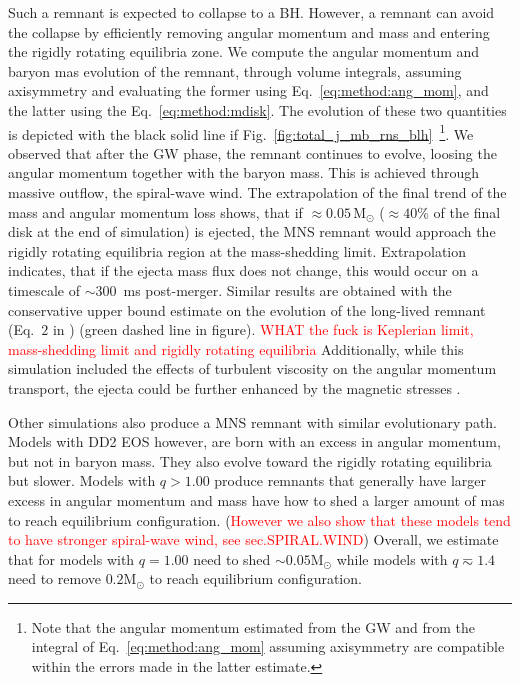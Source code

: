 \documentclass[11pt,a4paper,headinclude=true,DIV=14,BCOR=8mm,chapterprefix,listof=totoc,twoside,openright,abstracton]{scrbook}
\def\Msun{{\text{M}_{\odot}}}
\newcommand{\red}[1]{\textcolor{red}{#1}}
\newcommand{\swind}{spiral-wave wind}
\newcommand{\pmerg}{post-merger}
\begin{document}
Such a remnant is expected to collapse to a BH. 
However, a remnant can avoid the collapse by efficiently removing angular momentum
and mass and entering the rigidly rotating equilibria zone. 
We compute the angular momentum and baryon mas evolution of the remnant, 
through volume integrals, assuming axisymmetry and evaluating the former using Eq.~\eqref{eq:method:ang_mom}, and the latter using the Eq.~\eqref{eq:method:mdisk}. 
The evolution of these two quantities is depicted with the black solid line if 
Fig.~\eqref{fig:total_j_mb_rns_blh}~\footnote{Note that the angular momentum estimated
    from the GW and from the integral of Eq.~\eqref{eq:method:ang_mom} assuming
    axisymmetry are compatible within the errors made in the latter estimate.
}.
We observed that after the \ac{GW} phase, the remnant continues to evolve, loosing the 
angular momentum together with the baryon mass. This is achieved through massive outflow,
the \swind{}. 
The extrapolation of the final trend of the mass and angular momentum loss shows, that 
if $\approx0.05\,\Msun$ ($\approx40$\% of the final disk at the end of simulation) is 
ejected, the \ac{MNS} remnant would approach the rigidly rotating equilibria region 
at the mass-shedding limit. Extrapolation indicates, that if the ejecta mass flux does 
not change, this would occur on a timescale of $\sim 300$~ms \pmerg{}.
Similar results are obtained with the conservative upper bound estimate on the 
evolution of the long-lived remnant (Eq.~$2$ in \citet{Radice:2018xqa}) (green dashed line in figure).
\red{WHAT the fuck is Keplerian limit, mass-shedding limit and rigidly rotating equilibria}
Additionally, while this simulation included the effects of turbulent viscosity on the
angular momentum transport, the ejecta could be further enhanced by the magnetic stresses 
\citep{Metzger:2006mw,Bucciantini:2011kx,Siegel:2017nub,Fernandez:2018kax,Ciolfi:2020hgg}.

Other simulations also produce a \ac{MNS} remnant with similar evolutionary path. 
Models with DD2 \ac{EOS} however, are born with an excess in angular momentum, but not in 
baryon mass. They also evolve toward the rigidly rotating equilibria but slower.
Models with $q>1.00$ produce remnants that generally have larger excess in angular momentum 
and mass have how to shed a larger amount of mas to reach equilibrium configuration.
(\red{However we also show that these models tend to have stronger \swind{}, see sec.SPIRAL.WIND})
Overall, we estimate that for models with $q=1.00$ need to shed ${\sim}0.05\Msun$ while 
models with $q\eqsim 1.4$ need to remove $0.2\Msun$ to reach equilibrium configuration.
\end{document}
